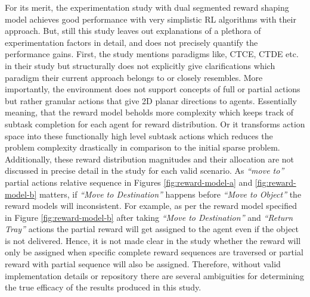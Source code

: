 \documentclass{article}
\begin{document}
For its merit, the experimentation study with dual segmented reward shaping model achieves good performance with very simplistic RL algorithms with their approach.
But, still this study leaves out explanations of a plethora of experimentation factors in detail, and does not precisely quantify the performance gains.
First, the study mentions paradigms like, CTCE, CTDE etc. in their study but structurally does not explicitly give clarifications which paradigm their current approach belongs to or closely resembles.
More importantly, the environment does not support concepts of full or partial actions but rather granular actions that give 2D planar directions to agents.
Essentially meaning, that the reward model beholds more complexity which keeps track of subtask completion for each agent for reward distribution.
Or it transforms action space into these functionally high level subtask actions which reduces the problem complexity drastically in comparison to the initial sparse problem.
Additionally, these reward distribution magnitudes and their allocation are not discussed in precise detail in the study for each valid scenario.
As \textit{“move to”} partial actions relative sequence in Figures \ref{fig:reward-model-a} and \ref{fig:reward-model-b} matters, if \textit{“Move to Destination”} happens before \textit{“Move to Object”} the reward models will inconsistent.
For example, as per the reward model specified in Figure \ref{fig:reward-model-b} after taking \textit{“Move to Destination”} and \textit{“Return Tray”} actions the partial reward will get assigned to the agent even if the object is not delivered.
Hence, it is not made clear in the study whether the reward will only be assigned when specific complete reward sequences are traversed or partial reward with partial sequence will also be assigned.
Therefore, without valid implementation details or repository there are several ambiguities for determining the true efficacy of the results produced in this study.
\end{document}
